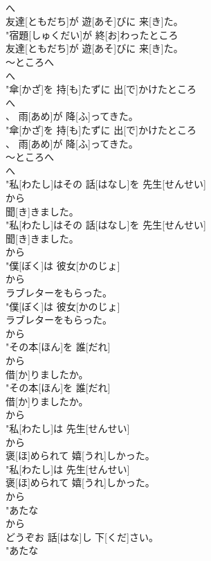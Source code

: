 \documentclass[8pt]{extreport}
\begin{document}
\begin{CJK}{UTF8}{min}
\\	へ
\\	友達[ともだち]が 遊[あそ]びに 来[き]た。
\\	"宿題[しゅくだい]が 終[お]わったところ
\\	友達[ともだち]が 遊[あそ]びに 来[き]た。
\\	～ところへ 
\\	へ
\\	"傘[かざ]を 持[も]たずに 出[で]かけたところ
\\	へ
\\	、 雨[あめ]が 降[ふ]ってきた。
\\	"傘[かざ]を 持[も]たずに 出[で]かけたところ
\\	、 雨[あめ]が 降[ふ]ってきた。
\\	～ところへ 
\\	へ
\\	"私[わたし]はその 話[はなし]を 先生[せんせい]
\\	から
\\	聞[き]きました。
\\	"私[わたし]はその 話[はなし]を 先生[せんせい]
\\	聞[き]きました。
\\	から
\\	"僕[ぼく]は 彼女[かのじょ]
\\	から
\\	ラブレターをもらった。
\\	"僕[ぼく]は 彼女[かのじょ]
\\	ラブレターをもらった。
\\	から
\\	"その本[ほん]を 誰[だれ]
\\	から
\\	借[か]りましたか。
\\	"その本[ほん]を 誰[だれ]
\\	借[か]りましたか。
\\	から
\\	"私[わたし]は 先生[せんせい]
\\	から
\\	褒[ほ]められて 嬉[うれ]しかった。
\\	"私[わたし]は 先生[せんせい]
\\	褒[ほ]められて 嬉[うれ]しかった。
\\	から
\\	"あたな
\\	から
\\	どうぞお 話[はな]し 下[くだ]さい。
\\	"あたな

\end{CJK}
\end{document}
